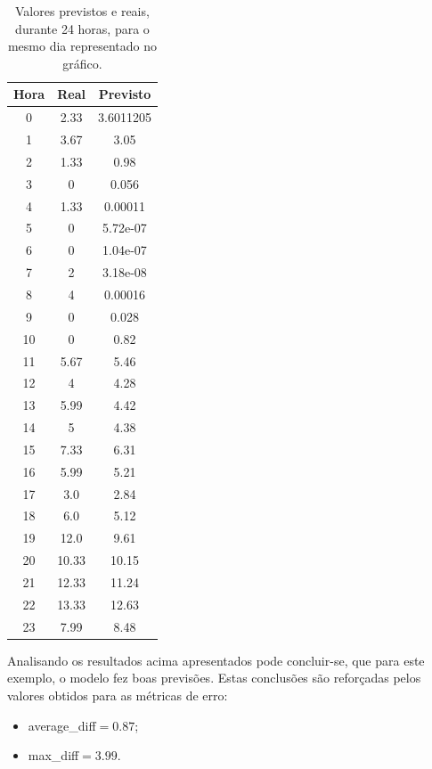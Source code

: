 \documentclass[a4paper, 12pt]{article}
\begin{document}
\begin{table}[H]
	\centering
	\begin{tabular}{||c||c|c||}
		\hline\hline
		Hora & Real&Previsto\\
		\hline\hline
		0 & 
		2.33
		&3.6011205 \\
		\hline
		1  &
		3.67 &3.05 \\
		\hline
		2 &  1.33& 0.98	\\
		\hline
		3  & 
		0
		&0.056 \\
		\hline
		4 & 1.33
		&0.00011 \\
		\hline
		5  & 
		0 &5.72e-07 \\
		\hline
		6 & 
		0
		& 
		
		1.04e-07 \\
		\hline
		7 & 
		2
		& 3.18e-08\\
		\hline
		8  &
		4 & 0.00016\\
		\hline
		9 &  0& 0.028	\\
		\hline
		10 & 
		0
		& 0.82\\
		\hline
		11  &
		5.67 & 5.46\\
		\hline
		12 & 4 & 4.28	\\
		\hline
		13  & 5.99
		
		&4.42 \\
		\hline
		14 & 
		5 &4.38 \\
		\hline
		15  & 7.33
		& 6.31 \\
		\hline
		16 & 
		5.99
		& 
		5.21
		\\
		\hline
		17 & 
		3.0
		& 2.84\\
		\hline
		18  &
		6.0 & 5.12\\
		\hline
		19 & 12.0 & 9.61	\\
		\hline
		20 & 
		10.33
		&10.15 \\
		\hline
		21  &
		12.33 &11.24 \\
		\hline
		22 & 13.33 & 12.63	\\
		\hline
		23  & 
		7.99
		& 8.48\\
		\hline\hline
	\end{tabular}
\caption{Valores previstos e reais, durante 24 horas, para o mesmo dia representado no gráfico.}
\end{table}

Analisando os resultados acima apresentados pode concluir-se, que para este exemplo, o modelo fez boas previsões. Estas conclusões são reforçadas pelos valores obtidos para as métricas de erro:

\begin{itemize}
	\item average\_diff$=0.87$;
	\item max\_diff$=3.99$.
\end{itemize}
\end{document}
